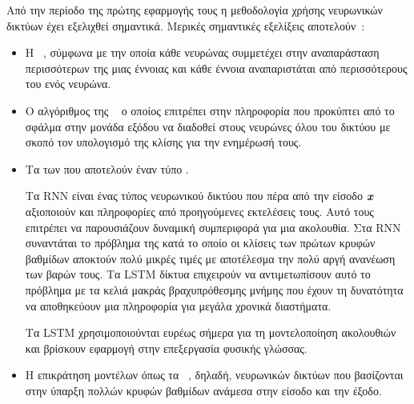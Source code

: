 Από την περίοδο της πρώτης εφαρμογής τους η μεθοδολογία χρήσης νευρωνικών δικτύων έχει εξελιχθεί σημαντικά.
Μερικές σημαντικές εξελίξεις αποτελούν~\cite{goodfellow}:
\begin{itemize}
    \item Η ~\cite{hinton1986learning},
          σύμφωνα με την οποία κάθε νευρώνας συμμετέχει στην αναπαράσταση περισσότερων της μιας έννοιας και κάθε έννοια αναπαριστάται από περισσότερους του ενός νευρώνα.
    \item Ο αλγόριθμος της ~\cite{werbos1974beyond,lecun1985procedure,parker1985learning,rumelhart1988learning}
          ο οποίος επιτρέπει στην πληροφορία που προκύπτει από το σφάλμα στην μονάδα εξόδου να διαδοθεί στους νευρώνες όλου του δικτύου με σκοπό τον υπολογισμό της κλίσης για την ενημέρωσή τους.
    \item Τα  των \citet{hochreiter1997long}
          που αποτελούν έναν τύπο .

          Τα RNN είναι ένας τύπος νευρωνικού δικτύου που πέρα από την είσοδο $\vx$ αξιοποιούν και πληροφορίες από προηγούμενες εκτελέσεις τους.
          Αυτό τους επιτρέπει να παρουσιάζουν δυναμική συμπεριφορά για μια ακολουθία.
          Στα RNN συναντάται το πρόβλημα της  κατά το οποίο οι κλίσεις των πρώτων κρυφών βαθμίδων αποκτούν πολύ μικρές τιμές με αποτέλεσμα την πολύ αργή ανανέωση των βαρών τους.
          Τα LSTM δίκτυα επιχειρούν να αντιμετωπίσουν αυτό το πρόβλημα με τα κελιά μακράς βραχυπρόθεσμης μνήμης που έχουν τη δυνατότητα να αποθηκεύουν μια πληροφορία για μεγάλα χρονικά διαστήματα.

          Τα LSTM χρησιμοποιούνται ευρέως σήμερα για τη μοντελοποίηση ακολουθιών και βρίσκουν εφαρμογή στην επεξεργασία φυσικής γλώσσας.
    \item Η επικράτηση μοντέλων 
          όπως τα ~\cite{hinton2006fast},
          δηλαδή, νευρωνικών δικτύων που βασίζονται στην ύπαρξη πολλών κρυφών βαθμίδων ανάμεσα στην είσοδο και την έξοδο.
\end{itemize}


